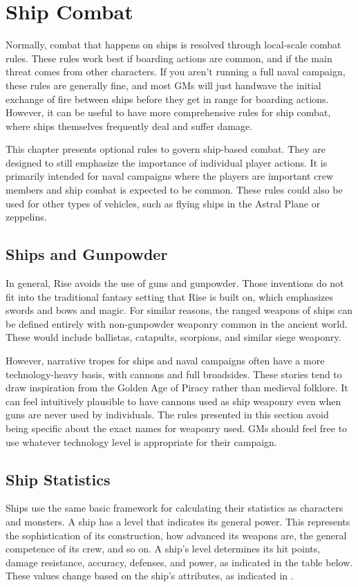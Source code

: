 \chapter{Ship Combat}
    Normally, combat that happens on ships is resolved through local-scale combat rules.
    These rules work best if boarding actions are common, and if the main threat comes from other characters.
    If you aren't running a full naval campaign, these rules are generally fine, and most GMs will just handwave the initial exchange of fire between ships before they get in range for boarding actions.
    However, it can be useful to have more comprehensive rules for ship combat, where ships themselves frequently deal and suffer damage.

    This chapter presents optional rules to govern ship-based combat.
    They are designed to still emphasize the importance of individual player actions.
    It is primarily intended for naval campaigns where the players are important crew members and ship combat is expected to be common.
    These rules could also be used for other types of vehicles, such as flying ships in the Astral Plane or zeppelins.

    \section{Ships and Gunpowder}
        In general, Rise avoids the use of guns and gunpowder.
        Those inventions do not fit into the traditional fantasy setting that Rise is built on, which emphasizes swords and bows and magic.
        For similar reasons, the ranged weapons of ships can be defined entirely with non-gunpowder weaponry common in the ancient world.
        These would include ballistas, catapults, scorpions, and similar siege weaponry.

        However, narrative tropes for ships and naval campaigns often have a more technology-heavy basis, with cannons and full broadsides.
        These stories tend to draw inspiration from the Golden Age of Piracy rather than medieval folklore.
        It can feel intuitively plausible to have cannons used as ship weaponry even when guns are never used by individuals.
        The rules presented in this section avoid being specific about the exact names for weaponry used.
        GMs should feel free to use whatever technology level is appropriate for their campaign.

    \section{Ship Statistics}
    Ships use the same basic framework for calculating their statistics as characters and monsters.
    A ship has a level that indicates its general power.
    This represents the sophistication of its construction, how advanced its weapons are, the general competence of its crew, and so on.
    A ship's level determines its hit points, damage resistance, accuracy, defenses, and power, as indicated in the table below.
    These values change based on the ship's attributes, as indicated in .

